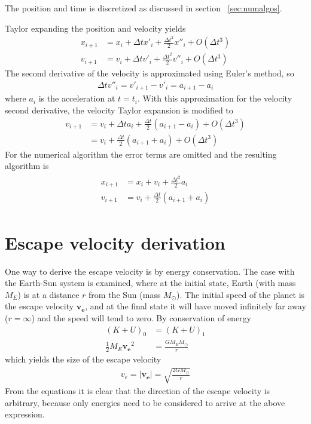 \documentclass[aps,reprint]{revtex4-1}
\newcommand\blankpage{%
  \null
  \thispagestyle{empty}%
  \addtocounter{page}{-1}%
  \newpage}
\begin{document}
The position and time is discretized as discussed in section ~\ref{sec:numalgos}.

Taylor expanding the position and velocity yields
\begin{align*}
  x_{i+1} &= x_i + \Delta{t} x'_i + \frac{\Delta{t}^2}{2} x''_i + O(\Delta{t}^3) \\
  v_{i+1} &= v_i + \Delta{t} v'_i + \frac{\Delta{t}^2}{2} v''_i + O(\Delta{t}^3)
\end{align*}
The second derivative of the velocity is approximated using Euler's method, so
\begin{align*}
  \Delta{t} v''_i = v'_{i+1} - v'_{i} = a_{i+1} - a_{i}
\end{align*}
where $a_i$ is the acceleration at $t = t_i$. With this approximation for the
velocity second derivative, the velocity Taylor expansion is modified to
\begin{align*}
  v_{i+1} &= v_i + \Delta{t} a_i + \frac{\Delta{t}}{2} (a_{i+1} - a_i) + O(\Delta{t}^3) \\
          &= v_i + \frac{\Delta{t}}{2} (a_{i+1} + a_{i}) + O(\Delta{t}^3)
\end{align*}
For the numerical algorithm the error terms are omitted and the resulting
algorithm is
\begin{align}
  \begin{split}
    x_{i+1} &= x_i + v_i + \frac{\Delta{t}^2}{2} a_i \\
    v_{i+1} &= v_i + \frac{\Delta{t}}{2}(a_{i+1} + a_{i})
  \end{split}
\end{align}
\section{Escape velocity derivation}
\label{sec:escapevelocityderivation}
One way to derive the escape velocity is by energy conservation. The case with the Earth-Sun system
is examined, where at the initial state, Earth (with mass $M_E$) is at a
distance $r$ from the Sun (mass $M_\odot$). The
initial speed of the planet is the escape velocity $\mathbf{v_e}$, and at the
final state it will have moved infinitely far away ($r = \infty$) and the speed
will tend to zero. By conservation of energy
\begin{align*}
  (K + U)_0 &= (K + U)_1 \\
  \frac{1}{2} M_E \mathbf{v_e}^2 &= \frac{GM_E M_\odot}{r}
\end{align*}
which yields the size of the escape velocity
\begin{align}
  v_e = |\mathbf{v_e}| = \sqrt{\frac{2GM_\odot}{r}}
\end{align}
From the equations it is clear that the direction of the escape velocity is
arbitrary, because only energies need to be considered to arrive at the above
expression.
\blankpage
\end{document}
